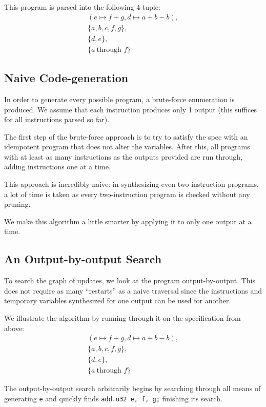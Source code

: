 \documentclass[letterpaper,twocolumn,10pt]{article}
\begin{document}
This program is parsed into the following 4-tuple:
\begin{align*}
    (e \mapsto f + g, d \mapsto a + b - b), \\
    \{a, b, c, f, g\}, \\
    \{d, e\}, \\
    \{a\ \text{through } f\}
\end{align*}

\subsection{Naive Code-generation}

In order to generate every possible program, a brute-force
enumeration is produced. We assume that each instruction
produces only 1 output (this suffices for all instructions
parsed so far).

The first step of the brute-force approach is to try to satisfy the
spec with an idempotent program that does not alter the variables.
After this, all programs with at least as many instructions as the
outputs provided are run through, adding instructions one at a time.

This approach is incredibly naive: in synthesizing even two instruction
programs, a lot of time is taken as every two-instruction program is
checked without any pruning.

We make this algorithm a little smarter by applying it to only one output
at a time.

\subsection{An Output-by-output Search}

To search the graph of updates, we look at the program output-by-output.
This does not require as many ``restarts'' as a naive traversal
since the instructions and temporary variables synthesized for
one output can be used for another.

We illustrate the algorithm by running through it on the specification from above:
\begin{align*}
    (e \mapsto f + g, d \mapsto a + b - b), \\
    \{a, b, c, f, g\}, \\
    \{d, e\}, \\
    \{a\ \text{through } f\}
\end{align*}

The output-by-output search arbitrarily begins by searching through
all means of generating \texttt{e} and quickly finds \texttt{add.u32 e, f, g;}
finishing its search.
\end{document}
